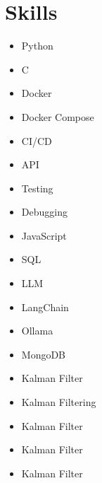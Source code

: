 \documentclass[11pt,a4paper]{article}
\begin{document}
\section*{Skills}
\begin{itemize}
  \item Python
  \item C
  \item Docker
  \item Docker Compose
  \item CI/CD
  \item API
  \item Testing
  \item Debugging
  \item JavaScript
  \item SQL
  \item LLM
  \item LangChain
  \item Ollama
  \item MongoDB
  \item Kalman Filter
  \item Kalman Filtering
  \item Kalman Filter
  \item Kalman Filter
  \item Kalman Filter
\end{itemize}
\end{document}
